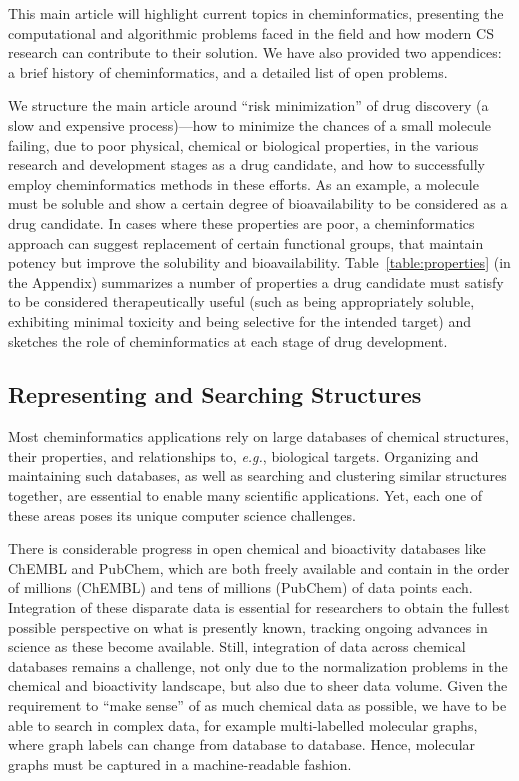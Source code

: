 \documentclass{sig-alternate}
\begin{document}
This main article will highlight current topics in
cheminformatics, presenting the computational and algorithmic problems
faced in the field and how modern CS research can contribute to their
solution.  We have also provided two appendices: a brief history of cheminformatics, and a detailed list of open problems.

We structure the main article around ``risk minimization'' of drug discovery (a slow and expensive process)---how to minimize the chances of a small
molecule failing, due to poor physical, chemical or biological
properties, in the various research and development stages as a drug
candidate, and how to successfully employ cheminformatics methods in
these efforts. As an example, a molecule must be soluble and show a
certain degree of bioavailability to be considered as a drug
candidate. In cases where these properties are poor, a cheminformatics
approach can suggest replacement of certain functional groups, that
maintain potency but improve the solubility and bioavailability.
Table~\ref{table:properties} (in the Appendix) summarizes a number of
properties a drug candidate must satisfy to be considered
therapeutically useful (such as being appropriately soluble,
exhibiting minimal toxicity and being selective for the intended
target) and sketches the role of cheminformatics at each stage of drug
development.
%
\subsection{Representing and Searching Structures}
\label{sec:databases}
%
Most cheminformatics applications rely on large databases of chemical
structures, their properties, and relationships to, \textit{e.g.},
biological targets.  Organizing and maintaining such databases, as
well as searching and clustering similar structures together, are
essential to enable many scientific applications. Yet, each one of
these areas poses its unique computer science challenges.

There is considerable progress in open chemical and bioactivity
databases like ChEMBL and PubChem, which are both freely
available and contain in the order of millions (ChEMBL) and tens of
millions (PubChem) of data points each. Integration of these disparate
data is essential for researchers to obtain the fullest possible
perspective on what is presently known, tracking ongoing advances in
science as these become available. Still, integration of data
across chemical databases remains a challenge, not only due
to the normalization problems in the chemical and bioactivity
landscape, but also due to sheer data volume.
Given the requirement to ``make sense'' of as much chemical data
as possible, we have to be able to search in complex data, for
example multi-labelled molecular graphs, where graph labels can change
from database to database. Hence, molecular graphs must be captured
in a machine-readable fashion.
\end{document}
